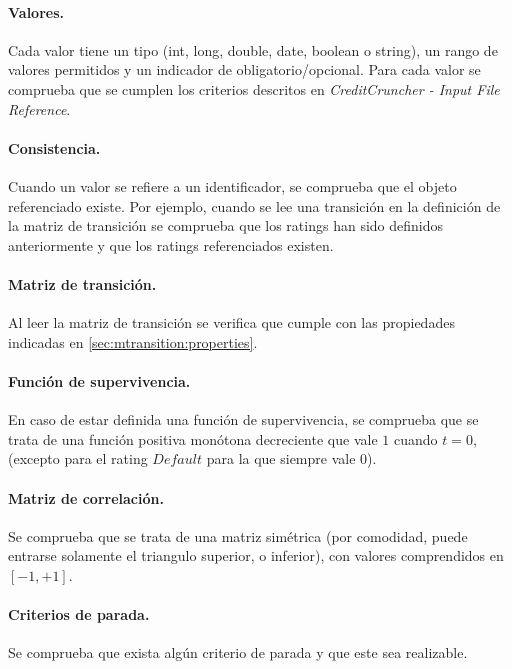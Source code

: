 \paragraph{Valores.} Cada valor tiene un tipo (int, long, double,
date, boolean o string), un rango de valores permitidos y un
indicador de obligatorio/opcional. Para cada valor se comprueba
que se cumplen los criterios descritos en
\emph{CreditCruncher - Input File Reference}.

\paragraph{Consistencia.} Cuando un valor se refiere a un identificador,
se comprueba que el objeto referenciado existe. Por ejemplo, cuando se
lee una transici\'on en la definici\'on de la matriz de transici\'on se
comprueba que los ratings han sido definidos anteriormente y que los
ratings referenciados existen.

\paragraph{Matriz de transici\'on.} Al leer la matriz de transici\'on
se verifica que cumple con las propiedades indicadas en
\ref{sec:mtransition:properties}.

\paragraph{Funci\'on de supervivencia.} En caso de estar definida
una funci\'on de supervivencia, se comprueba que se trata de una
funci\'on positiva mon\'otona decreciente que vale $1$ cuando $t=0$,
(excepto para el rating $Default$ para la que siempre vale $0$).

\paragraph{Matriz de correlaci\'on.} Se comprueba que se trata de
una matriz sim\'etrica (por comodidad, puede entrarse solamente
el triangulo superior, o inferior), con valores comprendidos
en $[-1,+1]$.

\paragraph{Criterios de parada.} Se comprueba que exista alg\'un
criterio de parada y que este sea realizable.


